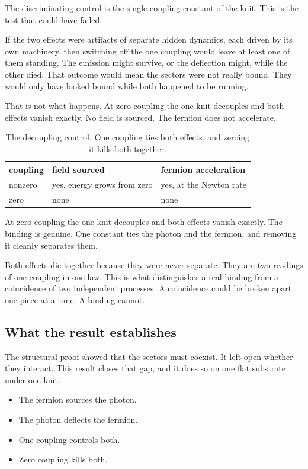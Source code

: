 The discriminating control is the single coupling constant of the knit. This is the test that could have failed.

If the two effects were artifacts of separate hidden dynamics, each driven by its own machinery, then switching off the one coupling would leave at least one of them standing. The emission might survive, or the deflection might, while the other died. That outcome would mean the sectors were not really bound. They would only have looked bound while both happened to be running.

That is not what happens. At zero coupling the one knit decouples and both effects vanish exactly. No field is sourced. The fermion does not accelerate.

\begin{table}[ht]
\centering
\begin{tabular}{@{}lll@{}}
\toprule
coupling & field sourced & fermion acceleration \\
\midrule
nonzero & yes, energy grows from zero & yes, at the Newton rate \\
zero & none & none \\
\bottomrule
\end{tabular}
\caption{The decoupling control. One coupling ties both effects, and zeroing it kills both together.}
\label{tab:co-emergence-killswitch}
\end{table}

\begin{principle}
At zero coupling the one knit decouples and both effects vanish exactly. The binding is genuine. One constant ties the photon and the fermion, and removing it cleanly separates them.
\end{principle}

Both effects die together because they were never separate. They are two readings of one coupling in one law. This is what distinguishes a real binding from a coincidence of two independent processes. A coincidence could be broken apart one piece at a time. A binding cannot.

\subsection{What the result establishes}

The structural proof showed that the sectors must coexist. It left open whether they interact. This result closes that gap, and it does so on one flat substrate under one knit.

\begin{itemize}
\item The fermion sources the photon.
\item The photon deflects the fermion.
\item One coupling controls both.
\item Zero coupling kills both.
\end{itemize}

